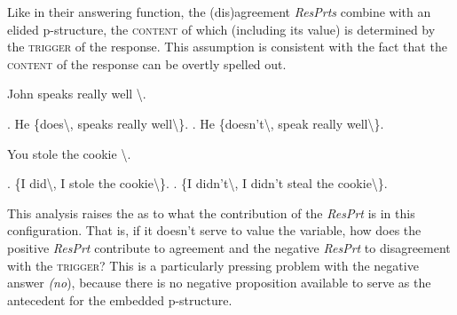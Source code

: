\documentclass[output=paper]{LSP/langsci}
\begin{document}
Like in their answering function, the (dis)agreement \textit{ResPrts} combine with an elided p-structure, the \textsc{content} of which (including its  value) is determined by the \textsc{trigger} of the response.
This assumption is consistent with the fact that the \textsc{content} of the response can be overtly spelled out. 


\ea\label{ex:wiltschko:19}
\begin{xlist}
  John speaks  really well {\textbackslash}.
      \begin{xlisti}
       \ex{}. {He \{does{\textbackslash}, speaks  really well{\textbackslash}}\}.    
       \ex{}.  {He \{doesn’t{\textbackslash}, speak  really well{\textbackslash}}\}. 
       \end{xlisti}
 \end{xlist}
\z

\ea\label{ex:wiltschko:20}
\begin{xlist}
  You stole the cookie {\textbackslash}.
 \begin{xlisti}
          \ex{}. \{{I did{\textbackslash},   I stole the cookie{\textbackslash}}\}.
          \ex{}.  \{{I didn’t{\textbackslash}, I didn’t steal the cookie{\textbackslash}}\}.  
         \end{xlisti}
\end{xlist}
\z

This analysis raises the  as to what the contribution of the \textit{ResPrt} is in this configuration. That is, if it doesn’t serve to value the  variable, how does the positive \textit{ResPrt} contribute to agreement and the negative \textit{ResPrt} to disagreement with the \textsc{trigger}? This is a particularly pressing problem with the negative answer \textit{(no}), because there is no negative proposition available to serve as the antecedent for the embedded p-structure.
 
\end{document}
